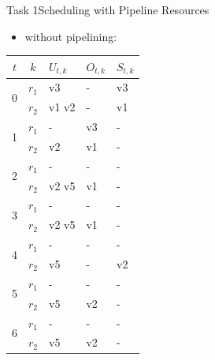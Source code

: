 \begin{frame}{Task 1}{Scheduling with Pipeline Resources}
  \begin{solutionnoinc}
    \begin{itemize}
      \item \alert{without pipelining}:
    \end{itemize}
      \centering
      \fontsize{3}{4}\selectfont
      \begin{tabular}{c|c|l|l|l|}
      \hline$t$                  & $k$   & $U_{t, k}$ & $O_{t, k}$ & $S_{t, k}$ \\
      \hline \multirow{2}{*}{0}  & $r_1$ & v3         & -          & v3 \\
      \cline { 2 - 5 }           & $r_2$ & v1 v2      & -          & v1 \\
      \hline \multirow{2}{*}{1}  & $r_1$ & -          & v3         & -  \\
      \cline { 2 - 5 }           & $r_2$ & v2         & v1         & -  \\
      \hline \multirow{2}{*}{2}  & $r_1$ & -          & -          & -  \\
      \cline { 2 - 5 }           & $r_2$ & v2 v5      & v1         & -  \\
      \hline \multirow{2}{*}{3}  & $r_1$ & -          & -          & -  \\
      \cline { 2 - 5 }           & $r_2$ & v2 v5      & v1         & -  \\
      \hline \multirow{2}{*}{4}  & $r_1$ & -          & -          & -  \\
      \cline { 2 - 5 }           & $r_2$ & v5         & -          & v2 \\
      \hline \multirow{2}{*}{5}  & $r_1$ & -          & -          & -  \\
      \cline { 2 - 5 }           & $r_2$ & v5         & v2         & -  \\
      \hline \multirow{2}{*}{6}  & $r_1$ & -          & -          & -  \\
      \cline { 2 - 5 }           & $r_2$ & v5         & v2         & -  \\

\end{tabular}
\end{solutionnoinc}
\end{frame}
